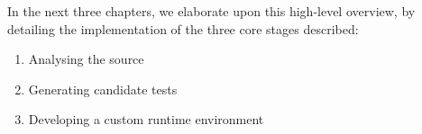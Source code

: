 % 

\vspace*{1cm}
In the next three chapters, we elaborate upon this high-level overview, by detailing the implementation of the three core stages described:

\begin{enumerate}
   \item Analysing the source
   \item Generating candidate tests
   \item Developing a custom runtime environment
\end{enumerate}